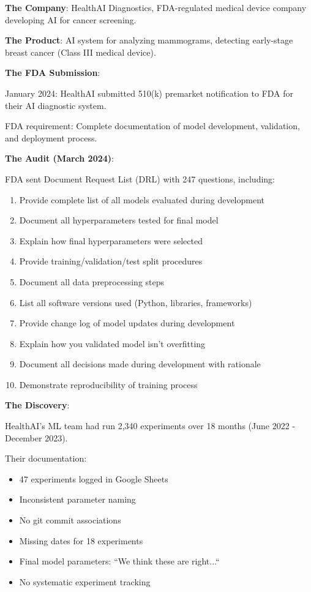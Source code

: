\textbf{The Company}: HealthAI Diagnostics, FDA-regulated medical device company developing AI for cancer screening.

\textbf{The Product}: AI system for analyzing mammograms, detecting early-stage breast cancer (Class III medical device).

\textbf{The FDA Submission}:

January 2024: HealthAI submitted 510(k) premarket notification to FDA for their AI diagnostic system.

FDA requirement: Complete documentation of model development, validation, and deployment process.

\textbf{The Audit (March 2024)}:

FDA sent Document Request List (DRL) with 247 questions, including:

\begin{enumerate}
    \item Provide complete list of all models evaluated during development
    \item Document all hyperparameters tested for final model
    \item Explain how final hyperparameters were selected
    \item Provide training/validation/test split procedures
    \item Document all data preprocessing steps
    \item List all software versions used (Python, libraries, frameworks)
    \item Provide change log of model updates during development
    \item Explain how you validated model isn't overfitting
    \item Document all decisions made during development with rationale
    \item Demonstrate reproducibility of training process
\end{enumerate}

\textbf{The Discovery}:

HealthAI's ML team had run 2,340 experiments over 18 months (June 2022 - December 2023).

Their documentation:
\begin{itemize}
    \item 47 experiments logged in Google Sheets
    \item Inconsistent parameter naming
    \item No git commit associations
    \item Missing dates for 18 experiments
    \item Final model parameters: ``We think these are right...``
    \item No systematic experiment tracking
\end{itemize}

